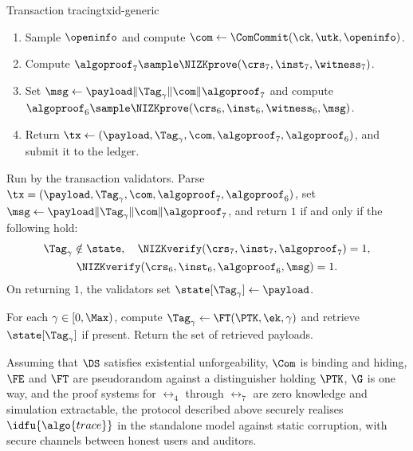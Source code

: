 \begin{protocolbox}{Transaction tracing}{txid-generic}
\begin{description}
\begin{enumerate}
	\item Sample $\openinfo$ and compute $\com \leftarrow
\ComCommit(\ck,\utk,\openinfo)$.

	\item Compute $\algoproof_7 \sample
\NIZKprove(\crs_7,\inst_7,\witness_7)$.

	\item Set $\msg \leftarrow \payload\|\Tag_\gamma\|\com\|\algoproof_7$
and compute $\algoproof_6 \sample \NIZKprove(\crs_6,\inst_6,\witness_6,\msg)$.

	\item Return $\tx \leftarrow
(\payload,\Tag_\gamma,\com,\algoproof_7,\algoproof_6)$, and submit it to the
ledger.

      \end{enumerate}

    \item[$\{0,1\} \leftarrow \algo{Verify}(\crs,\state,\tx)$ :] Run by the
transaction validators. Parse $\tx =
(\payload,\Tag_\gamma,\com,\algoproof_7,\algoproof_6)$, set $\msg \leftarrow
\payload\|\Tag_\gamma\|\com\|\algoproof_7$, and return $1$ if and only if the
following hold:
      \begin{gather*}
	\Tag_\gamma \notin \state, \quad
	\NIZKverify(\crs_7,\inst_7,\algoproof_7) = 1, \\
	\NIZKverify(\crs_6,\inst_6,\algoproof_6,\msg) = 1.
      \end{gather*}
      On returning $1$, the validators set $\state[\Tag_\gamma] \leftarrow
\payload$.

    \item[$\{\payload\} \leftarrow \IDidentify(\crs,\PTK,\ek,\epoch)$ :] For
each $\gamma \in [0,\Max)$, compute $\Tag_\gamma \leftarrow
\FT(\PTK,\ek,\gamma)$ and retrieve $\state[\Tag_\gamma]$ if present. Return
the set of retrieved payloads.

  \end{description}

\end{protocolbox}

\begin{theorem}\label{thm:txid-bb} Assuming that $\DS$ satisfies existential
unforgeability, $\Com$ is binding and hiding, $\FE$ and $\FT$ are pseudorandom
against a distinguisher holding $\PTK$, $\G$ is one way, and the
proof systems for $\rel_4$ through $\rel_7$ are zero knowledge and simulation
extractable, the protocol described above securely realises
$\idfu{\algo{trace}}$ in the standalone model against static corruption, with
secure channels between honest users and auditors.  \end{theorem}

